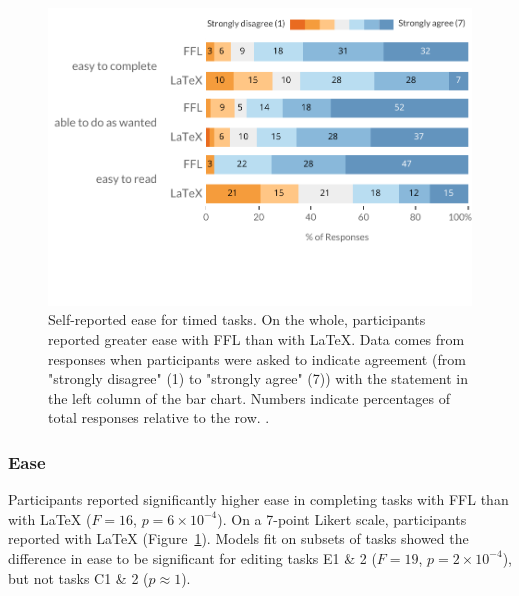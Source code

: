 \begin{figure}
    \centering
    \includegraphics[width=\linewidth]{figures/Responses.pdf}
    \vspace{-2.5em}
    \caption{Self-reported ease for timed tasks. On the whole, participants reported greater ease with FFL than with LaTeX. \normalfont Data comes from responses when participants were asked to indicate agreement (from "strongly disagree" (1) to "strongly agree" (7)) with the statement in the left column of the bar chart. Numbers indicate percentages of total responses relative to the row. .}
    \label{fig:responses}
\end{figure}

\subsubsection{Ease}\label{sec:ease}

Participants reported significantly higher ease in completing tasks with FFL than with LaTeX ($F=16$, $p=6\times10^{-4}$). On a 7-point Likert scale, participants reported  with LaTeX (Figure~\ref{fig:responses}). Models fit on subsets of tasks showed the difference in ease to be significant for editing tasks E1 \& 2 ($F=19$, $p=2\times10^{-4}$), but not tasks C1 \& 2 ($p\approx1$).

